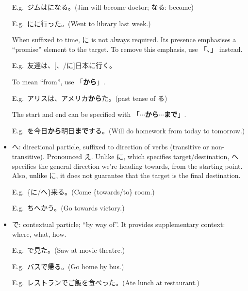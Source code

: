 \documentclass[../nihongo-gakushuu-kyouzai.tex]{subfiles}
\begin{document}
\begin{itemize}
    E.g.\ ジムはになる。(Jim will become doctor; なる: become)

    E.g.\ にに行った。(Went to library last week.)

    When suffixed to time, に is not always required. Its presence emphasises a ``promise'' element to the target. To remove this emphasis, use 「、」 instead.

    E.g.\ 友達は、[、/に]日本に行く。

    To mean ``from'', use 「\textbf{から}」.

    E.g.\ アリスは、アメリカ\textbf{から}た。(past tense of る)

    The start and end can be specified with 「\textbf{$\cdots$から$\cdots$まで}」.

    E.g.\ を今日\textbf{から}明日\textbf{まで}する。(Will do homework from today to tomorrow.)

    \item へ: directional particle, suffixed to direction of verbs (transitive or non-transitive). Pronounced え. Unlike に, which specifies target/destination, へ specifies the general direction we're heading towards, from the starting point. Also, unlike に, it does not guarantee that the target is the final destination. 

    E.g.\ \{に/へ\}来る。(Come \{towards/to\} room.)

    E.g.\ ちへかう。(Go towards victory.)
    \item で: contextual particle; ``by way of''. It provides supplementary context: where, what, how.

    E.g.\ で見た。(Saw at movie theatre.)

    E.g.\ バスで帰る。(Go home by bus.)

    E.g.\ レストランでご飯を食べった。(Ate lunch at restaurant.)
\end{itemize}
\end{document}
